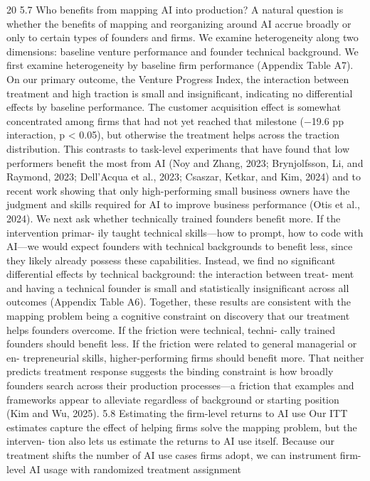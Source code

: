 20
5.7
Who benefits from mapping AI into production?
A natural question is whether the benefits of mapping and reorganizing around AI accrue broadly
or only to certain types of founders and firms. We examine heterogeneity along two dimensions:
baseline venture performance and founder technical background.
We first examine heterogeneity by baseline firm performance (Appendix Table A7). On our
primary outcome, the Venture Progress Index, the interaction between treatment and high traction
is small and insignificant, indicating no differential effects by baseline performance. The customer
acquisition effect is somewhat concentrated among firms that had not yet reached that milestone
(−19.6 pp interaction, p < 0.05), but otherwise the treatment helps across the traction distribution.
This contrasts to task-level experiments that have found that low performers benefit the most from
AI (Noy and Zhang, 2023; Brynjolfsson, Li, and Raymond, 2023; Dell’Acqua et al., 2023; Csaszar,
Ketkar, and Kim, 2024) and to recent work showing that only high-performing small business owners
have the judgment and skills required for AI to improve business performance (Otis et al., 2024).
We next ask whether technically trained founders benefit more.
If the intervention primar-
ily taught technical skills—how to prompt, how to code with AI—we would expect founders with
technical backgrounds to benefit less, since they likely already possess these capabilities. Instead,
we find no significant differential effects by technical background: the interaction between treat-
ment and having a technical founder is small and statistically insignificant across all outcomes
(Appendix Table A6).
Together, these results are consistent with the mapping problem being a cognitive constraint
on discovery that our treatment helps founders overcome. If the friction were technical, techni-
cally trained founders should benefit less. If the friction were related to general managerial or en-
trepreneurial skills, higher-performing firms should benefit more. That neither predicts treatment
response suggests the binding constraint is how broadly founders search across their production
processes—a friction that examples and frameworks appear to alleviate regardless of background or
starting position (Kim and Wu, 2025).
5.8
Estimating the firm-level returns to AI use
Our ITT estimates capture the effect of helping firms solve the mapping problem, but the interven-
tion also lets us estimate the returns to AI use itself. Because our treatment shifts the number of AI
use cases firms adopt, we can instrument firm-level AI usage with randomized treatment assignment
